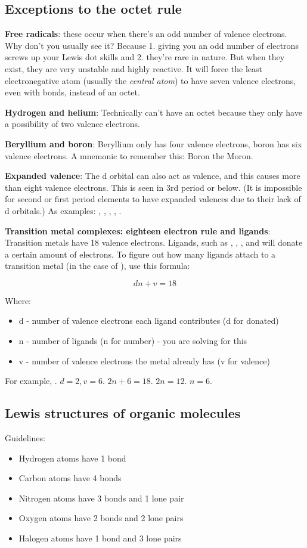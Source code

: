 \documentclass[letterpaper, 12pt]{article}
\begin{document}
	\subsection{Exceptions to the octet rule}
	\textbf{Free radicals}: these occur when there's an odd number of valence electrons. Why don't you usually see it? Because 1. giving you an odd number of electrons screws up your Lewis dot skills and 2. they're rare in nature. But when they exist, they are very unstable and highly reactive. It will force the least electronegative atom (usually the \textit{central atom}) to have seven valence electrons, even with bonds, instead of an octet.

	\textbf{Hydrogen and helium}: Technically can't have an octet because they only have a possibility of two valence electrons.

	\textbf{Beryllium and boron}: Beryllium only has four valence electrons, boron has six valence electrons. A mnemonic to remember this: Boron the Moron.

	\textbf{Expanded valence}: The d orbital can also act as valence, and this causes more than eight valence electrons. This is seen in 3rd period or below. (It is impossible for second or first period elements to have expanded valences due to their lack of d orbitals.) As examples: , , , , .

	\textbf{Transition metal complexes: eighteen electron rule and ligands}: Transition metals have 18 valence electrons. Ligands, such as , , , and  will donate a certain amount of electrons. To figure out how many ligands attach to a transition metal (in the case of ), use this formula:

	$$dn + v = 18$$

	Where:
	\begin{itemize}
		\item d - number of valence electrons each ligand contributes (d for donated)
		\item n - number of ligands (n for number) - you are solving for this
		\item v - number of valence electrons the metal already has (v for valence)
	\end{itemize}

	For example, . $d = 2, v = 6$. $2n + 6 = 18$. $2n = 12$. $n = 6$.

	\subsection{Lewis structures of organic molecules}
	Guidelines:
	\begin{itemize}
		\item Hydrogen atoms have 1 bond
		\item Carbon atoms have 4 bonds
		\item Nitrogen atoms have 3 bonds and 1  lone pair
		\item Oxygen atoms have 2 bonds and 2  lone pairs
		\item Halogen atoms have 1 bond and 3  lone pairs
	\end{itemize}
\end{document}
